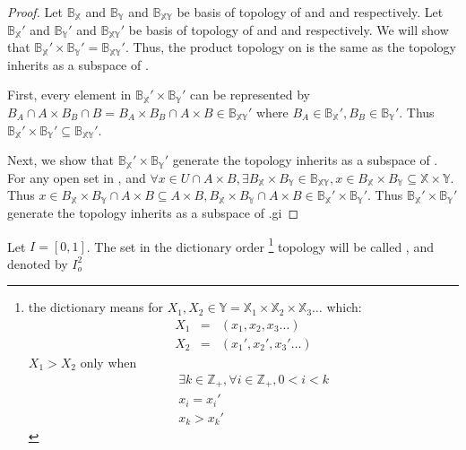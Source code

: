 \begin{proof}
      Let $ \mathbb{B}_{\mathbb{X}} $ and $ \mathbb{B}_{\mathbb{Y}} $ and $ \mathbb{B}_{\mathbb{XY}} $ be basis of topology of  and  and  respectively. Let $ \mathbb{B}_{\mathbb{X}}' $ and $ \mathbb{B}_{\mathbb{Y}}' $ and $ \mathbb{B}_{\mathbb{XY}}' $ be basis of topology of  and  and  respectively. We will show that $ \mathbb{B}_{\mathbb{X}}' \times \mathbb{B}_{\mathbb{Y}}' = \mathbb{B}_{\mathbb{XY}}' $. Thus,  the product topology on  is the same as the topology  inherits as a subspace of .

      First, every element in $ \mathbb{B}_{\mathbb{X}}' \times \mathbb{B}_{\mathbb{Y}}' $ can be represented by $ B_{A} \cap A \times B_{B} \cap B = B_{A} \times B_{B} \cap A \times B \in \mathbb{B}_{\mathbb{XY}}' $ where $ B_{A} \in \mathbb{B}_{\mathbb{X}}', B_{B} \in \mathbb{B}_{\mathbb{Y}}' $. Thus $ \mathbb{B}_{\mathbb{X}}' \times \mathbb{B}_{\mathbb{Y}}' \subseteq \mathbb{B}_{\mathbb{XY}}' $.

      Next, we show that $ \mathbb{B}_{\mathbb{X}}' \times \mathbb{B}_{\mathbb{Y}}' $ generate the topology  inherits as a subspace of . For any open set  in , and $ \forall x \in U \cap A \times B, \exists B_{\mathbb{X}} \times B_{\mathbb{Y}} \in \mathbb{B}_{\mathbb{XY}}, x \in B_{\mathbb{X}} \times B_{\mathbb{Y}} \subseteq \mathbb{X} \times \mathbb{Y} $.
      Thus $ x \in B_{\mathbb{X}} \times B_{\mathbb{Y}} \cap A \times B \subseteq A \times B, B_{\mathbb{X}} \times B_{\mathbb{Y}} \cap A \times B \in \mathbb{B}_{\mathbb{X}}' \times \mathbb{B}_{\mathbb{Y}}' $.
      Thus $ \mathbb{B}_{\mathbb{X}}' \times \mathbb{B}_{\mathbb{Y}}' $ generate the topology  inherits as a subspace of .gi
\end{proof}

\begin{definition}\label{def:OrderedSquare}
      Let $ I = [0,1] $. The set  in the dictionary order \footnote{
            the dictionary means for $ X_{1}, X_{2} \in \mathbb{Y} = \mathbb{X}_{1} \times \mathbb{X}_{2} \times \mathbb{X}_{3} \dots $ which:
            \begin{eqnarray*}
                  X_{1} &=& (x_{1},x_{2},x_{3}\dots)\\
                  X_{2} &=& (x_{1}',x_{2}',x_{3}'\dots)
            \end{eqnarray*}
            $ X_1 > X_2 $ only when
            \begin{eqnarray*}
                  && \exists k \in \mathbb{Z}_{+}, \forall i \in \mathbb{Z}_{+}, 0 < i < k \\
                  && x_{i} = x_{i}'\\
                  && x_{k} > x_{k}'
            \end{eqnarray*}
      } topology will be called , and denoted by $ I_{o}^{2} $
\end{definition}

